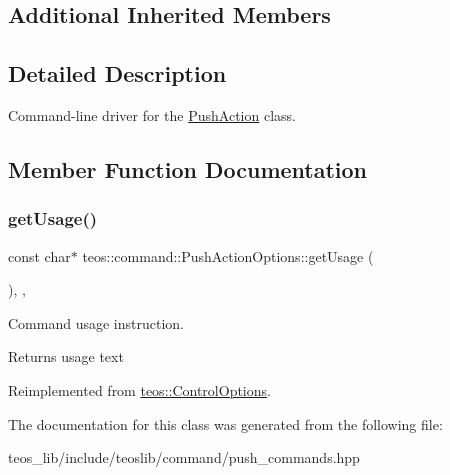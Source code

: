 \subsection*{Additional Inherited Members}


\subsection{Detailed Description}
Command-\/line driver for the \mbox{\hyperlink{classteos_1_1command_1_1_push_action}{Push\+Action}} class. 

\subsection{Member Function Documentation}
\mbox{\label{classteos_1_1command_1_1_push_action_options_a1dac78e7b40cc0ff91895d1fc0f7d2b4}} 
\subsubsection{\texorpdfstring{get\+Usage()}{getUsage()}}
{\footnotesize\ttfamily const char$\ast$ teos\+::command\+::\+Push\+Action\+Options\+::get\+Usage (\begin{DoxyParamCaption}{ }\end{DoxyParamCaption})\hspace{0.3cm}{\ttfamily [inline]}, {\ttfamily [protected]}, {\ttfamily [virtual]}}



Command \textquotesingle{}usage\textquotesingle{} instruction. 

\begin{DoxyReturn}{Returns}
usage text 
\end{DoxyReturn}


Reimplemented from \mbox{\hyperlink{classteos_1_1_control_options_a0aa5671f9bc750ed5280c26c543874f3}{teos\+::\+Control\+Options}}.



The documentation for this class was generated from the following file\+:\begin{DoxyCompactItemize}
\item 
teos\+\_\+lib/include/teoslib/command/push\+\_\+commands.\+hpp\end{DoxyCompactItemize}
